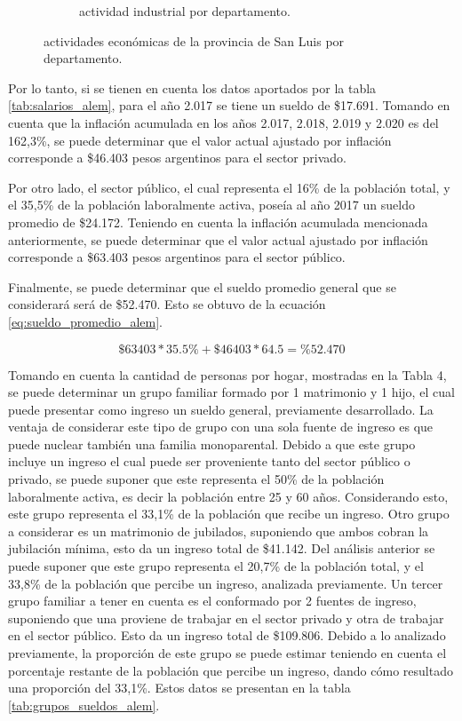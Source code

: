 \documentclass[11pt,a4paper]{article}
\begin{document}
\begin{figure}[ht!]
\begin{subfigure}[b]{0.48\textwidth}
            \captionsetup{width=0.7\linewidth}
            \caption{actividad industrial por departamento.}
            \label{fig:industria}     
        \end{subfigure}%
        
        \caption{actividades económicas de la provincia de San Luis por departamento.}
        \label{fig:econo_deptos}
    \end{figure}


Por lo tanto, si se tienen en cuenta los datos aportados por la tabla \ref{tab:salarios_alem}, para el año 2.017 se tiene un sueldo de \$17.691. 
Tomando en cuenta que la inflación acumulada en los años 2.017, 2.018, 2.019 y 2.020 es del 162,3\%, se puede determinar que el valor actual ajustado por inflación corresponde a \$46.403 pesos argentinos para el sector privado.

Por otro lado, el sector público, el cual representa el 16\% de la población total, y el 35,5\% de la población laboralmente activa, poseía al año 2017 un sueldo promedio de \$24.172. 
Teniendo en cuenta la inflación acumulada mencionada anteriormente, se puede determinar que el valor actual ajustado por inflación corresponde a \$63.403 pesos argentinos para el sector público.

Finalmente, se puede determinar que el sueldo promedio general que se considerará será de \$52.470. Esto se obtuvo de la ecuación \ref{eq:sueldo_promedio_alem}.


\begin{equation}
    \$63403*35.5\% + \$46403*64.5=\%52.470
    \label{eq:sueldo_promedio_alem}
\end{equation}


Tomando en cuenta la cantidad de personas por hogar, mostradas en la Tabla 4, se puede determinar un grupo familiar formado por 1 matrimonio y 1 hijo, el cual puede presentar como ingreso un sueldo general, previamente desarrollado.
La ventaja de considerar este tipo de grupo con una sola fuente de ingreso es que puede nuclear también una familia monoparental.
Debido a que este grupo incluye un ingreso el cual puede ser proveniente tanto del sector público o privado, se puede suponer que este representa el 50\% de la población laboralmente activa, es decir la población entre 25 y 60 años.
Considerando esto, este grupo representa el 33,1\% de la población que recibe un ingreso.
Otro grupo a considerar es un matrimonio de jubilados, suponiendo que ambos cobran la jubilación mínima, esto da un ingreso total de \$41.142. 
Del análisis anterior se puede suponer que este grupo representa el 20,7\% de la población total, y el 33,8\% de la población que percibe un ingreso, analizada previamente. 
Un tercer grupo familiar a tener en cuenta es el conformado por 2 fuentes de ingreso, suponiendo que una proviene de trabajar en el sector privado y otra de trabajar en el sector público. 
Esto da un ingreso total de \$109.806.
Debido a lo analizado previamente, la proporción de este grupo se puede estimar teniendo en cuenta el porcentaje restante de la población que percibe un ingreso, dando cómo resultado una proporción del 33,1\%. Estos datos se presentan en la tabla \ref{tab:grupos_sueldos_alem}.
\end{document}
